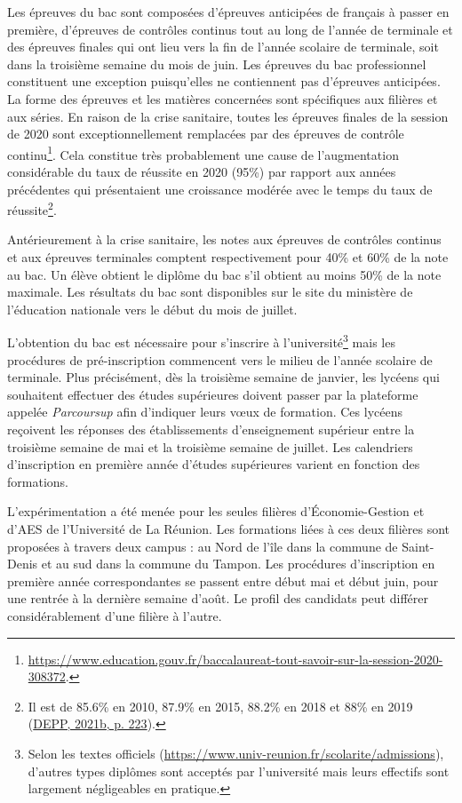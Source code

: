 \documentclass[
]{book}
\begin{document}
\quad Les épreuves du bac sont composées d'épreuves anticipées de français à passer en première, d'épreuves de contrôles continus tout au long de l'année de terminale et des épreuves finales qui ont lieu vers la fin de l'année scolaire de terminale, soit dans la troisième semaine du mois de juin. Les épreuves du bac professionnel constituent une exception puisqu'elles ne contiennent pas d'épreuves anticipées. La forme des épreuves et les matières concernées sont spécifiques aux filières et aux séries. En raison de la crise sanitaire, toutes les épreuves finales de la session de 2020 sont exceptionnellement remplacées par des épreuves de contrôle continu\footnote{\url{https://www.education.gouv.fr/baccalaureat-tout-savoir-sur-la-session-2020-308372}.}. Cela constitue très probablement une cause de l'augmentation considérable du taux de réussite en 2020 (95\%) par rapport aux années précédentes qui présentaient une croissance modérée avec le temps du taux de réussite\footnote{Il est de 85.6\% en 2010, 87.9\% en 2015, 88.2\% en 2018 et 88\% en 2019 (\protect\hyperlink{ref-DEP:21}{DEPP, 2021b, p. 223}).}.

\quad Antérieurement à la crise sanitaire, les notes aux épreuves de contrôles continus et aux épreuves terminales comptent respectivement pour 40\% et 60\% de la note au bac. Un élève obtient le diplôme du bac s'il obtient au moins 50\% de la note maximale. Les résultats du bac sont disponibles sur le site du ministère de l'éducation nationale vers le début du mois de juillet.

\quad L'obtention du bac est nécessaire pour s'inscrire à l'université\footnote{Selon les textes officiels (\url{https://www.univ-reunion.fr/scolarite/admissions}), d'autres types diplômes sont acceptés par l'université mais leurs effectifs sont largement négligeables en pratique.} mais les procédures de pré-inscription commencent vers le milieu de l'année scolaire de terminale. Plus précisément, dès la troisième semaine de janvier, les lycéens qui souhaitent effectuer des études supérieures doivent passer par la plateforme appelée \emph{Parcoursup} afin d'indiquer leurs vœux de formation. Ces lycéens reçoivent les réponses des établissements d'enseignement supérieur entre la troisième semaine de mai et la troisième semaine de juillet. Les calendriers d'inscription en première année d'études supérieures varient en fonction des formations.

\quad L'expérimentation a été menée pour les seules filières d'Économie-Gestion et d'AES de l'Université de La Réunion. Les formations liées à ces deux filières sont proposées à travers deux campus : au Nord de l'île dans la commune de Saint-Denis et au sud dans la commune du Tampon. Les procédures d'inscription en première année correspondantes se passent entre début mai et début juin, pour une rentrée à la dernière semaine d'août. Le profil des candidats peut différer considérablement d'une filière à l'autre.
\end{document}
